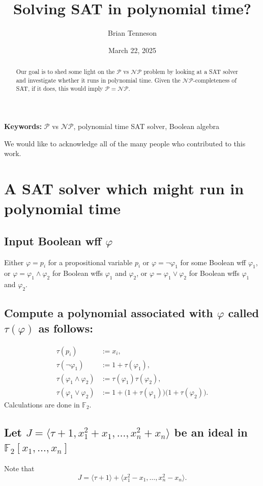 \documentclass[11pt]{article}
\title{Solving SAT in polynomial time?}
\author{Brian Tenneson}
\date{March 22, 2025}
\begin{document}
\maketitle

\begin{abstract}
Our goal is to shed some light on the $\mathcal{P}$ vs $\mathcal{NP}$ problem by looking at a SAT solver and investigate whether it runs in polynomial time. Given the $\mathcal{NP}$-completeness of SAT, if it does, this would imply $\mathcal{P}=\mathcal{NP}$.
\end{abstract}

\noindent\textbf{Keywords:} $\mathcal{P}$ vs $\mathcal{NP}$, polynomial time SAT solver, Boolean algebra

\medskip
\noindent We would like to acknowledge all of the many people who contributed to this work.

\section{A SAT solver which might run in polynomial time}

\subsection{Input Boolean wff $\varphi$}
Either $\varphi=p_i$ for a propositional variable $p_i$ or $\varphi=\neg\varphi_1$ for some Boolean wff $\varphi_1$, or $\varphi=\varphi_1\wedge\varphi_2$ for Boolean wffs $\varphi_1$ and $\varphi_2$, or $\varphi=\varphi_1\vee\varphi_2$ for Boolean wffs $\varphi_1$ and $\varphi_2$.

\subsection{Compute a polynomial associated with $\varphi$ called $\tau(\varphi)$ as follows:}
\begin{align*}
\tau(p_i) &:= x_i,\\[0.65em]
\tau(\neg\varphi_1) &:= 1+\tau(\varphi_1),\\[0.65em]
\tau(\varphi_1\wedge\varphi_2) &:= \tau(\varphi_1)\tau(\varphi_2),\\[0.65em]
\tau(\varphi_1\vee\varphi_2) &:= 1+\bigl(1+\tau(\varphi_1)\bigr)\bigl(1+\tau(\varphi_2)\bigr).
\end{align*}
Calculations are done in $\mathbb{F}_2$.

\subsection{Let $J=\langle \tau+1,x_1^2+x_1,\ldots,x_n^2+x_n\rangle$ be an ideal in $\mathbb{F}_2[x_1,\ldots,x_n]$}
Note that
\[
J=\langle\tau+1\rangle+\langle x_1^2-x_1,\ldots,x_n^2-x_n\rangle.
\]
\end{document}
